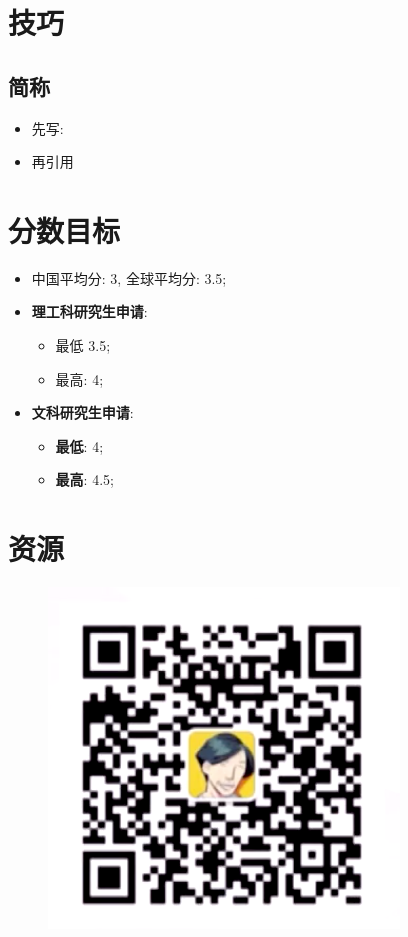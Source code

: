 \section{技巧}

  \subsection{简称}

    \begin{itemize}
      \item 先写: 
      \item 再引用 
    \end{itemize}

\section{分数目标}

  \begin{itemize}
    \item 中国平均分: 3, 全球平均分: 3.5;
    \item \textbf{理工科研究生申请}:
    \begin{itemize}
      \item 最低 3.5;
      \item 最高: 4;
    \end{itemize}

    \item \textbf{文科研究生申请}:
    \begin{itemize}
      \item \textbf{最低}: 4;
      \item \textbf{最高}: 4.5;
    \end{itemize}
  \end{itemize}

\section{资源}

  \begin{figure}[H]
    \centering
    \includegraphics[width=0.5\columnwidth]{images/保罗主义.png}
  \end{figure}
